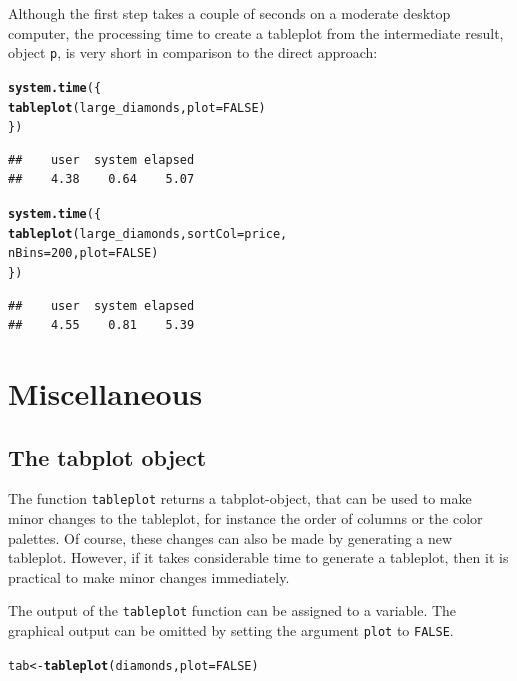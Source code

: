\documentclass[11pt, fleqn, a4paper]{article}\usepackage{graphicx, color}
\makeatletter
\newcommand{\hlfunctioncall}[1]{\textcolor[rgb]{0.501960784313725,0,0.329411764705882}{\textbf{#1}}}%
\newenvironment{kframe}{%
 \def\at@end@of@kframe{}%
 \ifinner\ifhmode%
  \def\at@end@of@kframe{\end{minipage}}%
  \begin{minipage}{\columnwidth}%
 \fi\fi%
 \def\FrameCommand##1{\hskip\@totalleftmargin \hskip-\fboxsep
 \colorbox{shadecolor}{##1}\hskip-\fboxsep
     \hskip-\linewidth \hskip-\@totalleftmargin \hskip\columnwidth}%
 \MakeFramed {\advance\hsize-\width
   \@totalleftmargin\z@ \linewidth\hsize
   \@setminipage}}%
 {\par\unskip\endMakeFramed%
 \at@end@of@kframe}
\newenvironment{knitrout}{}{} %
\makeatother
\begin{document}
Although the first step takes a couple of seconds on a moderate desktop computer, the processing time to create a tableplot from the intermediate result, object {\tt p}, is very short in comparison to the direct approach:


\begin{knitrout}
\color{fgcolor}\begin{kframe}
\begin{alltt}
\hlfunctioncall{system.time}(\{
    \hlfunctioncall{tableplot}(large_diamonds, plot = FALSE)
\})
\end{alltt}
\begin{verbatim}
##    user  system elapsed 
##    4.38    0.64    5.07
\end{verbatim}
\begin{alltt}

\hlfunctioncall{system.time}(\{
    \hlfunctioncall{tableplot}(large_diamonds, sortCol = price, 
        nBins = 200, plot = FALSE)
\})
\end{alltt}
\begin{verbatim}
##    user  system elapsed 
##    4.55    0.81    5.39
\end{verbatim}
\end{kframe}
\end{knitrout}



\section{Miscellaneous}

\subsection{The tabplot object}\label{sectab}

The function {\tt tableplot} returns a tabplot-object, that can be used to make minor changes to the tableplot, for instance the order of columns or the color palettes. Of course, these changes can also be made by generating a new tableplot. However, if it takes considerable time to generate a tableplot, then it is practical to make minor changes immediately.

The output of the {\tt tableplot} function can be assigned to a variable. The graphical output can be omitted by setting the argument {\tt plot} to {\tt FALSE}.

\begin{knitrout}
\color{fgcolor}\begin{kframe}
\begin{alltt}
tab <- \hlfunctioncall{tableplot}(diamonds, plot = FALSE)
\end{alltt}
\end{kframe}
\end{knitrout}
\end{document}
